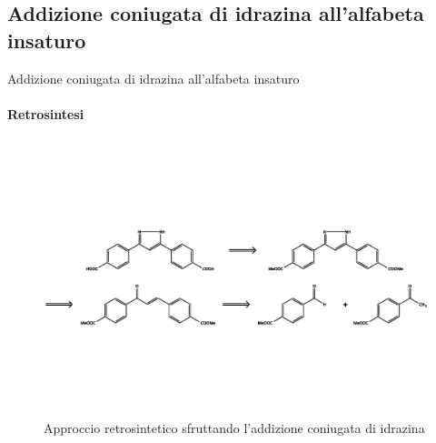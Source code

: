 \documentclass{beamer}
\begin{document}
\subsection{Addizione coniugata di idrazina all'alfabeta insaturo}

\begin{frame}{Addizione coniugata di idrazina all'alfabeta insaturo}
	\framesubtitle{Retrosintesi}
	\begin{figure}[h!]
		\centering
		\includegraphics[width=13cm,height=8cm,keepaspectratio]{../Structures/pyrazole-retro-alt.eps}
		\caption{Approccio retrosintetico sfruttando l'addizione coniugata di idrazina}
	\end{figure}
\end{frame}
\end{document}
